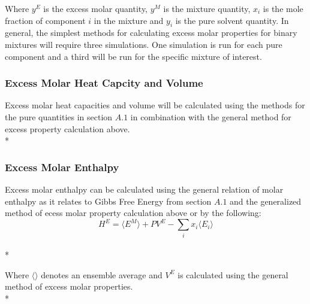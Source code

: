 \documentclass[a4paper,12pt]{article}
\begin{document}
\noindent Where $y^E$ is the excess molar quantity, $y^M$ is the mixture quantity, $x_i$ is the mole fraction of component $i$ in the mixture and $y_i$ is the pure solvent quantity. In general, the simplest methods for calculating excess molar properties for binary mixtures will require three simulations. One simulation is run for each pure component and a third will be run for the specific mixture of interest.

\subsubsection{Excess Molar Heat Capcity and Volume}
\noindent Excess molar heat capacities and volume will be calculated using the  methods for the pure quantities in section $A.1$ in combination with the general method for excess property calculation above.\\*

\subsubsection{Excess Molar Enthalpy}
\noindent Excess molar enthalpy can be calculated using the general relation of molar enthalpy as it relates to Gibbs Free Energy from section $A.1$ and the generalized method of ecess molar property calculation above or by the following:
\begin{equation}H^E = \langle E^M \rangle + P V^E - \sum_{i} x_i \langle E_i \rangle\end{equation}\\*

\noindent Where $\langle \rangle$ denotes an ensemble average and $V^E$ is calculated using the general method of excess molar properties.\\* 
\end{document}
